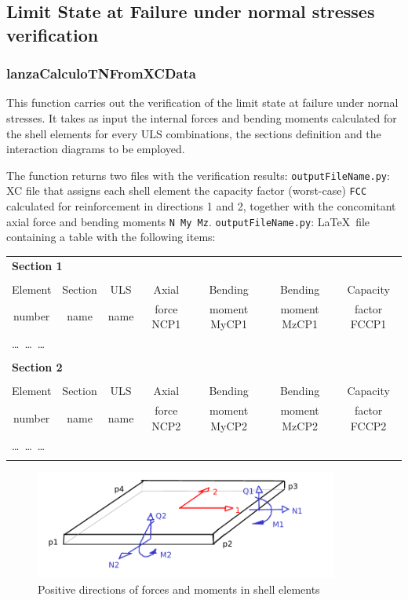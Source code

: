 \subsection{Limit State at Failure under normal stresses verification}

\subsubsection{lanzaCalculoTNFromXCData}
This function carries out the verification of the limit state at failure under nornal stresses. It takes as input the internal forces and bending moments calculated for the shell elements for every ULS combinations, the sections definition and the interaction diagrams to be employed.

The function returns two files with the verification results:
{\tt outputFileName.py}: XC file that assigns each shell element the capacity factor (worst-case) {\tt FCC} calculated for reinforcement in directions 1 and 2, together with the concomitant axial force and bending moments {\tt N My Mz}.
{\tt outputFileName.py}: \LaTeX\  file containing a table with the following items:

\begin{center}
\begin{tabular}{ccccccc}
\multicolumn{7}{l}{\textbf{Section 1}} \\
\\
Element & Section & ULS & Axial & Bending & Bending & Capacity \\
number  & name & name & force NCP1 & moment MyCP1 & moment MzCP1 & factor FCCP1 \\
\hline
\multicolumn{7}{l}{\ldots\ \ldots\ \ldots} \\
\\
\multicolumn{7}{l}{\textbf{Section 2}} \\
\\
Element & Section & ULS & Axial & Bending & Bending & Capacity \\
number  & name & name & force NCP2 & moment MyCP2 & moment MzCP2 & factor FCCP2 \\
\hline
\multicolumn{7}{l}{\ldots\ \ldots\ \ldots} \\
\\

\end{tabular}
\end{center}

\begin{figure}[h]
\centering
\includegraphics[width=100mm]{materials/figures/signosEsfuerzos}
\caption{Positive directions of forces and moments in shell elements}\label{shell_forces_moments}
\end{figure}

